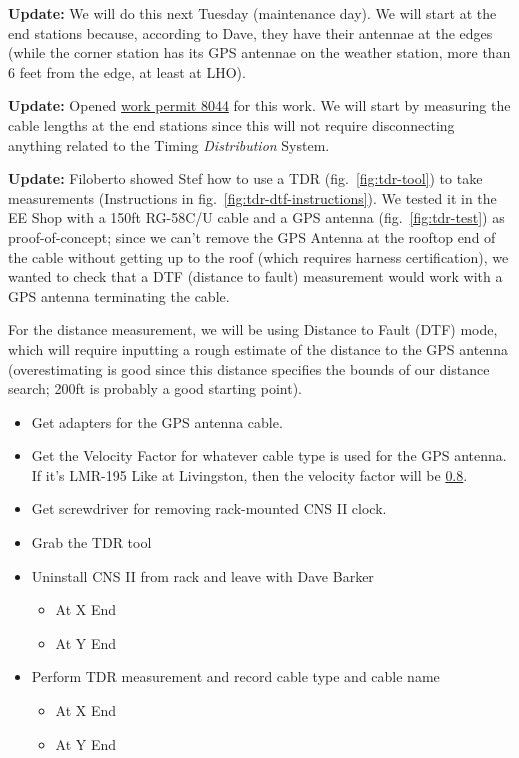 \documentclass{article}
\newcommand*{\TODO}{\textcolor{todo}}
\begin{document}
\textbf{Update:} We will do this next Tuesday (maintenance day). We will start at the end stations because, according to Dave, they have their antennae at the edges (while the corner station has its GPS antennae on the weather station, more than 6 feet from the edge, at least at LHO).

\textbf{Update:} Opened \href{https://services.ligo-la.caltech.edu/LHO/workpermits/view.php?permit_id=8044}{work permit 8044} for this work. We will start by measuring the cable lengths at the end stations since this will not require disconnecting anything related to the Timing \textit{Distribution} System.

\textbf{Update:} Filoberto showed Stef how to use a TDR (fig.~\ref{fig:tdr-tool}) to take measurements (Instructions in fig.~\ref{fig:tdr-dtf-instructions}). We tested it in the EE Shop with a 150ft RG-58C/U cable and a GPS antenna (fig.~\ref{fig:tdr-test}) as proof-of-concept; since we can't remove the GPS Antenna at the rooftop end of the cable without getting up to the roof (which requires harness certification), we wanted to check that a DTF (distance to fault) measurement would work with a GPS antenna terminating the cable.

For the distance measurement, we will be using Distance to Fault (DTF) mode, which will require inputting a rough estimate of the distance to the GPS antenna (overestimating is good since this distance specifies the bounds of our distance search; 200ft is probably a good starting point). 

\begin{itemize}
    \item{\TODO{Get adapters for the GPS antenna cable.}}
    \item{\TODO{Get the Velocity Factor for whatever cable type is used for the GPS antenna.}} If it's LMR-195 Like at Livingston, then the velocity factor will be \href{https://www.pasternack.com/50-ohm-low-loss-flexible-lmr195-pe-jacket-double-shielded-black-lmr-195-p.aspx}{0.8}.
    \item{\TODO{Get screwdriver for removing rack-mounted CNS II clock.}}
    \item{\TODO{Grab the TDR tool}}
    \item{\TODO{Uninstall CNS II from rack and leave with Dave Barker}}
    \begin{itemize}
        \item \TODO{At X End}
        \item \TODO{At Y End}
    \end{itemize}
    \item{\TODO{Perform TDR measurement and record cable type and cable name}}
    \begin{itemize}
        \item \TODO{At X End}
        \item \TODO{At Y End}
    \end{itemize}
\end{itemize}
\end{document}
